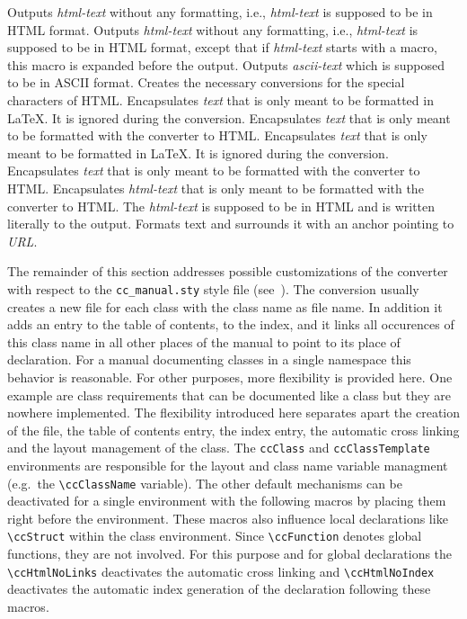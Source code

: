 \documentclass[11pt]{article}
\begin{document}
\begin{description}
    Outputs {\em html-text\/} without any formatting, i.e., {\em html-text\/} 
    is supposed to be in HTML format.
    Outputs {\em html-text\/} without any formatting, i.e., {\em html-text\/} 
    is supposed to be in HTML format, except that if {\em html-text\/} 
    starts with a macro, this macro is expanded before the output.    
    Outputs {\em ascii-text\/} which is supposed to be in ASCII format.
    Creates the necessary conversions for the special characters of HTML.
    Encapsulates {\em text\/} that is only meant to be formatted in \LaTeX.
    It is ignored during the conversion.
    Encapsulates {\em text\/} that is only meant to be formatted with the 
    converter to HTML.
    Encapsulates {\em text\/} that is only meant to be formatted in
    \LaTeX. It is ignored during the conversion.
    Encapsulates {\em text\/} that is only meant to be formatted with the 
    converter to HTML.
    Encapsulates {\em html-text\/} that is only meant to be formatted with the 
    converter to HTML. The {\em html-text\/} is supposed to be in HTML and
    is written literally to the output.
    Formats text and surrounds it with an anchor pointing to {\em URL}.
\end{description}

The remainder of this section addresses possible customizations of the
converter with respect to the {\tt cc\_manual.sty} style file
(see~\cite{k-clswr-99}).  The conversion usually creates a new file
for each class with the class name as file name. In addition it adds
an entry to the table of contents, to the index, and it links all
occurences of this class name in all other places of the manual to
point to its place of declaration. For a manual documenting classes in
a single namespace this behavior is reasonable. For other purposes,
more flexibility is provided here. One example are class requirements
that can be documented like a class but they are nowhere implemented.
The flexibility introduced here separates apart the creation of the
file, the table of contents entry, the index entry, the automatic
cross linking and the layout management of the class. The
\verb+ccClass+ and \verb+ccClassTemplate+ environments are responsible
for the layout and class name variable managment (e.g.~the
\verb+\ccClassName+ variable).  The other default mechanisms can be
deactivated for a single environment with the following macros by
placing them right before the environment. These macros also influence
local declarations like \verb+\ccStruct+ within the class environment.
Since \verb+\ccFunction+ denotes global functions, they are not
involved.  For this purpose and for global declarations the
\verb+\ccHtmlNoLinks+ deactivates the automatic cross linking and
\verb+\ccHtmlNoIndex+ deactivates the automatic index generation of
the declaration following these macros.
\end{document}
